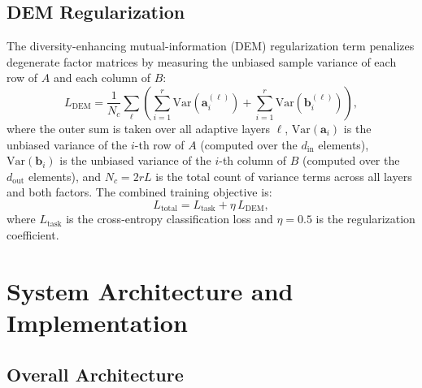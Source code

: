\documentclass[conference]{IEEEtran}
\begin{document}
\subsection{DEM Regularization}
The diversity-enhancing mutual-information (DEM) regularization
term \cite{chen2024dora} penalizes degenerate factor matrices
by measuring the unbiased sample variance of each row of $A$
and each column of $B$:
\begin{equation}
  L_{\text{DEM}} =
    \frac{1}{N_c}\sum_{\ell}\left(
      \sum_{i=1}^{r}\mathrm{Var}(\mathbf{a}_i^{(\ell)})
      + \sum_{i=1}^{r}\mathrm{Var}(\mathbf{b}_i^{(\ell)})
    \right),
  \label{eq:dem}
\end{equation}
where the outer sum is taken over all adaptive layers $\ell$,
$\mathrm{Var}(\mathbf{a}_i)$ is the unbiased variance of the
$i$-th row of $A$ (computed over the $d_{\text{in}}$
elements), $\mathrm{Var}(\mathbf{b}_i)$ is the unbiased
variance of the $i$-th column of $B$ (computed over the
$d_{\text{out}}$ elements), and $N_c = 2 r L$ is the total
count of variance terms across all layers and both factors.
The combined training objective is:
\begin{equation}
  L_{\text{total}} = L_{\text{task}} + \eta\,L_{\text{DEM}},
  \label{eq:total_loss}
\end{equation}
where $L_{\text{task}}$ is the cross-entropy classification
loss and $\eta = 0.5$ is the regularization coefficient.

\section{System Architecture and Implementation}
\label{sec:arch}

\subsection{Overall Architecture}
\end{document}
